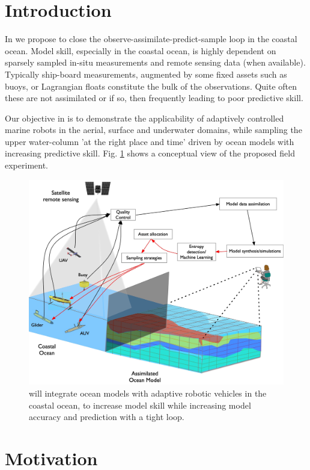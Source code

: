 \section*{Introduction}

In \proj we propose to close the observe-assimilate-predict-sample
loop in the coastal ocean. Model skill, especially in the coastal
ocean, is highly dependent on sparsely sampled in-situ measurements
and remote sensing data (when available). Typically ship-board
measurements, augmented by some fixed assets such as buoys, or
Lagrangian floats constitute the bulk of the observations. Quite often
these are not assimilated or if so, then frequently leading to poor
predictive skill.

Our objective in \proj is to demonstrate the applicability of
adaptively controlled marine robots in the aerial, surface and
underwater domains, while sampling the upper water-column 'at the
right place and time' driven by ocean models with increasing
predictive skill. Fig. \ref{fig:block-diag} shows a conceptual view of
the proposed field experiment.

\begin{figure}[!b]
  \centering
  \includegraphics[scale=0.15]{fig/ensemble.jpg}
  \caption{\proj will integrate ocean models with adaptive robotic vehicles
    in the coastal ocean, to increase model skill while increasing
    model accuracy and prediction with a tight loop.}
  \label{fig:block-diag}
\end{figure}

\section*{Motivation}

